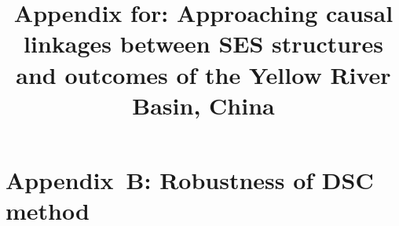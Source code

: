 \documentclass[default,sn-standardnature]{sn-jnl}
\begin{document}
\title{Appendix for: Approaching causal linkages between SES structures and outcomes of the Yellow River Basin, China}









\renewcommand{\figurename}{Supplementary Figure}
\renewcommand{\appendixname}{Appendix~\Alph{section}}
\setcounter{section}{0}

\newpage
\section*{Appendix~B: Robustness of DSC method}\label{secS2}
\renewcommand{\thefigure}{B\arabic{figure}}
\renewcommand{\thetable}{B\arabic{table}}
\setcounter{figure}{0}
\setcounter{table}{0}


% 




\label{bib}
\end{document}
